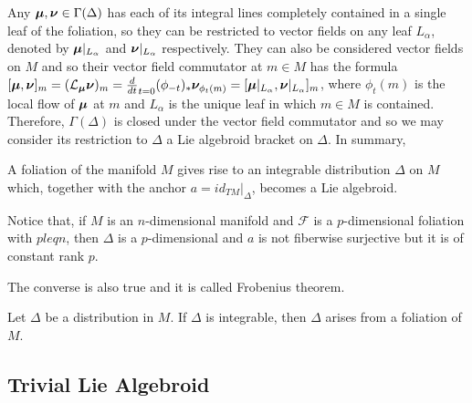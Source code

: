 Any $\bm{\mu}, \bm{\nu} \in \Gamma(\Delta)$ has each of its integral lines completely contained in a single leaf of the foliation, so they can be restricted to vector fields on any leaf $L_\alpha$, denoted by $\bm{\mu}|_{L_\alpha}$ and $\bm{\nu}|_{L_\alpha}$ respectively. They can also be considered vector fields on $M$ and so their vector field commutator at $m \in M$ has the formula $[\sect \mu, \sect \nu]_m = (\mathcal L_{\sect \mu} \sect \nu)_m = \frac{d}{dt}_{t=0} (\phi_{-t})_* \sect \nu_{\phi_t(m)} = [\sect \mu|_{L_\alpha}, \sect \nu|_{L_\alpha}]_m$, where $\phi_t(m)$ is the local flow of $\bm{\mu}$ at $m$ and $L_\alpha$ is the unique leaf in which $m \in M$ is contained. Therefore, $\Gamma(\Delta)$ is closed under the vector field commutator and so we may consider its restriction to $\Delta$ a Lie algebroid bracket on $\Delta$. In summary, 
\begin{proposition}
A foliation of the manifold $M$ gives rise to an integrable distribution $\Delta$ on $M$ which, together with the anchor $a = id_{TM}|_\Delta$, becomes a Lie algebroid.
\end{proposition}
Notice that, if $M$ is an $n$-dimensional manifold and $\mathcal F$ is a $p$-dimensional foliation with $p leq n$, then $\Delta$ is a $p$-dimensional and $a$ is not fiberwise surjective but it is of constant rank $p$.

The converse is also true and it is called Frobenius theorem.

\begin{proposition}
Let $\Delta$ be a distribution in $M$. If $\Delta$ is integrable, then $\Delta$ arises from a foliation of $M$.
\end{proposition}



\subsection{Trivial Lie Algebroid}

